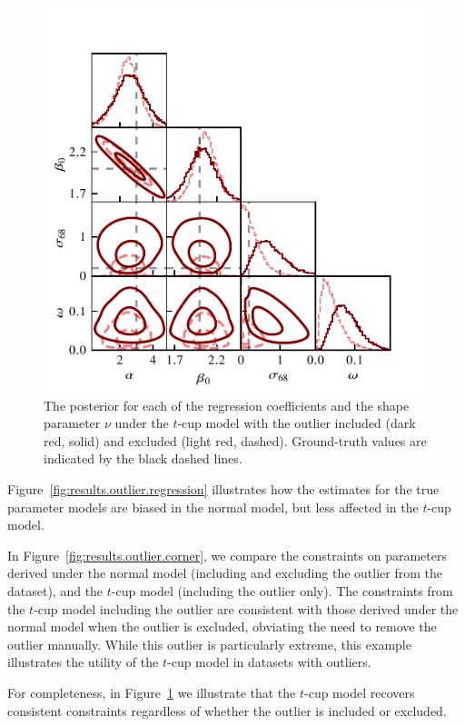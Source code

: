 \documentclass[fleqn,usenatbib]{rasti}
\begin{document}
\begin{figure}
    \includegraphics[width=\columnwidth]{graphics/fixed/corner_outlier_tcup.pdf}
    \caption{The posterior for each of the regression coefficients and the shape
    parameter $\nu$ under the $t$-cup model with the outlier included (dark red,
    solid) and excluded (light red, dashed). Ground-truth values are indicated
    by the black dashed lines.}
    \label{fig:results.outlier.tcup}
\end{figure}

Figure~\ref{fig:results.outlier.regression} illustrates how the estimates for
the true parameter models are biased in the normal model, but less affected in
the $t$-cup model.

In Figure~\ref{fig:results.outlier.corner}, we compare the constraints on
parameters derived under the normal model (including and excluding the outlier
from the dataset), and the $t$-cup model (including the outlier only). The
constraints from the $t$-cup model including the outlier are consistent with
those derived under the normal model when the outlier is excluded, obviating the
need to remove the outlier manually. While this outlier is particularly extreme,
this example illustrates the utility of the $t$-cup model in datasets with
outliers.

For completeness, in Figure~\ref{fig:results.outlier.tcup} we illustrate that
the $t$-cup model recovers consistent constraints regardless of whether the
outlier is included or excluded.
\end{document}
